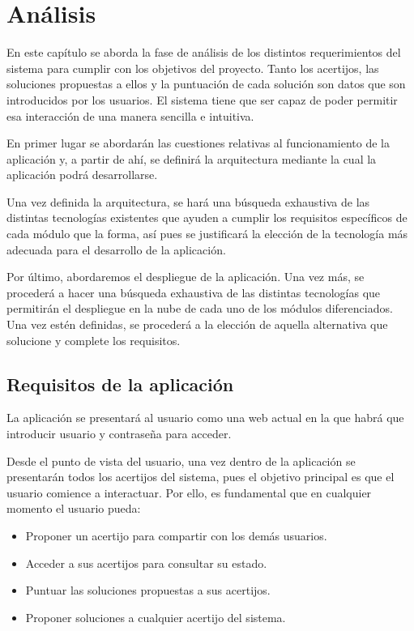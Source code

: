 \chapter{Análisis}
En este capítulo se aborda la fase de análisis de los distintos requerimientos  del sistema para cumplir con los objetivos del proyecto. Tanto los acertijos, las soluciones propuestas a ellos y la puntuación de cada solución son datos que son introducidos por los usuarios. El sistema tiene que ser capaz de poder permitir esa interacción de una manera sencilla e intuitiva.

En primer lugar se abordarán las cuestiones relativas al funcionamiento de la aplicación y, a partir de ahí, se definirá la arquitectura mediante la cual la aplicación podrá desarrollarse.

Una vez definida la arquitectura, se hará una búsqueda exhaustiva de las distintas tecnologías existentes que ayuden a cumplir los requisitos específicos de cada módulo que la forma, así pues se justificará la elección de la tecnología más adecuada para el desarrollo de la aplicación.

Por último, abordaremos el despliegue de la aplicación. Una vez más, se procederá a hacer una búsqueda exhaustiva de las distintas tecnologías que permitirán el despliegue en la nube de cada uno de los módulos diferenciados. Una vez estén definidas, se procederá a la elección de aquella alternativa que solucione y complete los requisitos.

\section{Requisitos de la aplicación}

La aplicación se presentará al usuario como una web actual en la que habrá que introducir usuario y contraseña para acceder. 

Desde el punto de vista del usuario, una vez dentro de la aplicación se presentarán todos los acertijos del sistema, pues el objetivo principal es que el usuario comience a interactuar. Por ello, es fundamental que en cualquier momento el usuario pueda:

\begin{itemize}
    \item Proponer un acertijo para compartir con los demás usuarios.
    \item Acceder a sus acertijos para consultar su estado.
    \item Puntuar las soluciones propuestas a sus acertijos.
    \item Proponer soluciones a cualquier acertijo del sistema.
\end{itemize}

